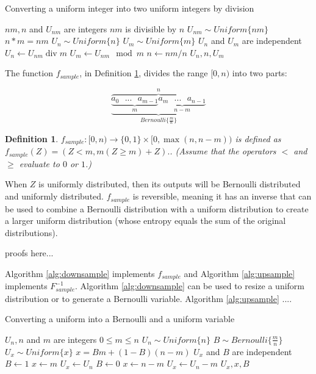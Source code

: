 \documentclass[12pt]{article}
\newtheorem{definition}{Definition}
\begin{document}
\begin{algorithm}
\caption{Converting a uniform integer into two uniform integers by division}
\label{alg:divide}
\begin{algorithmic}[1]
    \Require $nm, n$ and $U_{nm}$ are integers
    \Require $nm$ is divisible by $n$
    \Require $U_{nm} \sim Uniform\{nm\}$
    \Ensure $n * m = nm$
    \Ensure $U_{n} \sim Uniform\{n\}$
    \Ensure $U_{m} \sim Uniform\{m\}$
    \Ensure $U_n$ and $U_m$ are independent
  \State $U_n \gets U_{nm} \operatorname{div} m$
  \State $U_m \gets U_{nm} \mod m$
  \State $n \gets nm / n$
  \State \Return $U_n, n, U_m$
\EndProcedure
\end{algorithmic}
\end{algorithm}


The function $f_{sample}$, in Definition \ref{def:sample}, divides the range $[0,n)$ into two parts:

\[
\overbrace{
    \underbrace{
        \underbrace{a_0 \text{   } ... \text{   } a_{m-1}}_{m}
        \underbrace{a_m \text{   } ... \text{   } a_{n-1}}_{n-m}}
    }_{Bernoulli\{\frac{m}{n}\}}^{n}
\]

\begin{definition}
$f_{sample}: [0,n) \rightarrow \{0,1\} \times [0,\max(n,n-m))$ is defined as $f_{sample}(Z) = (Z<m, m(Z\ge m) + Z).$. (Assume that the operators $<$ and $\ge$ evaluate to $0$ or $1$.)
\label{def:sample}
\end{definition}

When $Z$ is uniformly distributed, then its outputs will be Bernoulli distributed and uniformly distributed. $f_{sample}$ is reversible, meaning it has an inverse that can be used to combine a Bernoulli distribution with a uniform distribution to create a larger uniform distribution (whose entropy equals the sum of the original distributions).

proofs here...

Algorithm \ref{alg:downsample} implements $f_{sample}$ and Algorithm \ref{alg:upsample} implements $F^{-1}_{sample}$. Algorithm \ref{alg:downsample} can be used to resize a uniform distribution or to generate a Bernoulli variable. Algorithm \ref{alg:upsample} ....


\begin{algorithm}
\caption{Converting a uniform into a Bernoulli and a uniform variable}
\label{alg:downsample}
\begin{algorithmic}[1]
    \Require $U_n, n$ and $m$ are integers 
    \Require $0 \le m \le n$
    \Require $U_n \sim Uniform \{n\}$
    \Ensure $B \sim Bernoulli\{\frac{m}{n}\}$
    \Ensure $U_x \sim Uniform\{x\}$
    \Ensure $x = Bm + (1-B)(n-m)$
    \Ensure $U_x$ and $B$ are independent
    \State $B \gets 1$  
    \State $x \gets m$
    \State $U_x \gets U_n$
  \Else
    \State $B \gets 0$  
    \State $x \gets n-m$
    \State $U_x \gets U_n-m$
  \EndIf
  \State \Return $U_x, x, B$
\EndProcedure
\end{algorithmic}
\end{algorithm}
\end{document}
